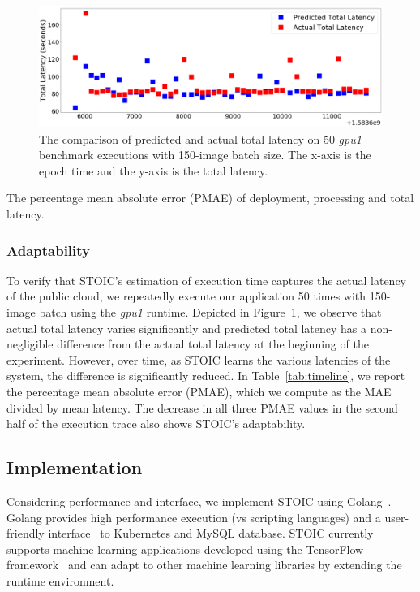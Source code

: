  \begin{figure}
    \centering
    \includegraphics[scale=0.12]{figures/timeline.png}
    \caption{The comparison of predicted and actual total latency on 50 \textit{gpu1} benchmark executions with 150-image batch size. The x-axis is the epoch time and the y-axis is the total latency. \label{fig:timeline}}
\end{figure}

\begin{table}
\centering

\caption{The percentage mean absolute error (PMAE) of deployment, processing and total latency.  \label{tab:timeline}}
\end{table}
 
 \subsubsection{Adaptability}
 
To verify that STOIC's estimation of execution time captures the actual latency of the public cloud, we repeatedly execute our application 50 times with 150-image batch using the \textit{gpu1} runtime. Depicted in Figure~\ref{fig:timeline}, we observe that actual total latency varies significantly and predicted total latency has a non-negligible difference from the actual total latency at the beginning of the experiment. However, over time, as STOIC learns the various latencies of the system, the difference is significantly reduced. In Table~\ref{tab:timeline}, we report the percentage mean absolute error (PMAE), which we compute as the MAE divided by mean latency. The decrease in all three PMAE values in the second half of the execution trace also shows STOIC's adaptability.
 

 \subsection{Implementation}

Considering performance and interface, we implement STOIC using Golang~\cite{ref:golang}. Golang provides high performance execution (vs scripting languages) and a user-friendly interface~\cite{ref:client-go} to Kubernetes and MySQL database. STOIC currently supports machine learning applications developed using the TensorFlow framework~\cite{ref:tensorflow} and can adapt to other machine learning libraries by extending the runtime environment.
 
